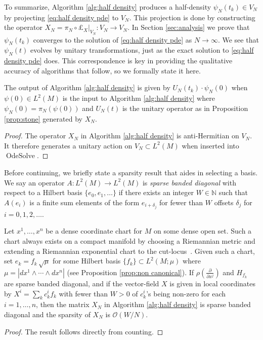\documentclass[final,leqno]{siamart}
\newcommand{\pder}[2]{\ensuremath{\frac{ \partial #1}{\partial #2}}}
\begin{document}
To summarize, Algorithm \ref{alg:half density} produces a half-density $\psi_{N}(t_{k}) \in V_{N}$ by projecting \eqref{eq:half density pde} to $V_N$.
This projection is done by constructing the operator $X_{N} = \pi_{N} \circ \pounds_{X} |_{V_{N}}: V_{N} \to V_{N}$.
In Section \ref{sec:analysis} we prove that $\psi_{N}(t_{k})$ converges to the solution of \eqref{eq:half density pde} as $N \to \infty$.
We see that $\psi_{N}(t)$ evolves by unitary transformations, just as the exact solution to \eqref{eq:half density pde} does.
This correspondence is key in providing the qualitative accuracy of algorithms that follow, so we formally state it here.
\begin{proposition} \label{prop:unitary}
	The output of Algorithm \ref{alg:half density} is given by $U_{N}(t_{k}) \cdot \psi_{N}(0)$ when $\psi(0) \in L^2(M)$ is the input to Algorithm \ref{alg:half density} where $\psi_{N}(0) = \pi_{N}( \psi(0) )$ and $U_{N}(t)$ is the unitary operator as in Proposition \ref{prop:stone} generated by $X_{N}$.
\end{proposition}
\begin{proof}
	The operator $X_{N}$ in Algorithm \ref{alg:half density} is anti-Hermitian on $V_{N}$.
	It therefore generates a unitary action on $V_{N} \subset L^{2}(M)$ when inserted into $\operatorname{OdeSolve}$.
\end{proof}

Before continuing, we briefly state a sparsity result that aides in selecting a basis.
We say an operator $A : L^{2}(M) \to L^{2}(M)$ is \emph{sparse banded diagonal} with respect to a Hilbert basis $\{ e_{0} , e_{1},\dots\}$ if there exists an integer $W \in \mathbb{N}$
such that $A(e_{i})$ is a finite sum elements of the form $e_{i + \delta_{j}}$ for fewer than $W$ offsets $\delta_{j}$ for $i = 0,1,2, \dots$.
\begin{theorem} \label{thm:sparsity}
	Let $x^{1},\dots,x^{n}$ be a dense coordinate chart for $M$ on some dense open set.
	Such a chart always exists on a compact manifold by choosing a Riemannian metric and extending a Riemannian exponential chart to the cut-locus~\cite{Sakai1996,MO_dense_charts}.
	Given such a chart, set $e_{k}= f_{k} \, \sqrt{\mu}$ for some Hilbert basis $\{f_{k}\} \subset L^2(M; \mu)$ where $\mu = | dx^{1} \wedge \cdots \wedge dx^{n}|$ (see Proposition \ref{prop:non canonical}).
	If $\rho( \pder{}{x^{j}})$ and $H_{f_{k}}$ are sparse banded diagonal, 
	and if the vector-field $X$ is given in local coordinates by $X^{i} = \sum_{k} c_{k}^{i} f_{k}$ with fewer than $W>0$ of $c^{i}_{k}$'s being non-zero for each $i=1,\dots,n$, then the matrix $X_{N}$ in Algorithm \ref{alg:half density} is sparse banded diagonal and the sparsity of $X_{N}$ is $\mathcal{O}( W / N )$.
\end{theorem}
\begin{proof}
The result follows directly from counting.
\end{proof}
\end{document}
